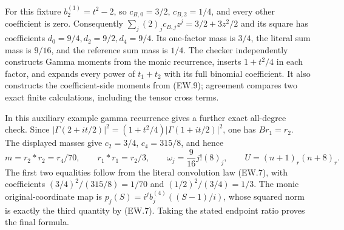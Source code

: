 \documentclass[11pt]{article}
\begin{document}
For this fixture $b_2^{(1)}=t^2-2$, so
$c_{B,0}=3/2$, $c_{B,2}=1/4$, and every other coefficient is
zero. Consequently $\sum_j(2)_jc_{B,j}z^j=3/2+3z^2/2$ and
its square has coefficients $d_0=9/4,d_2=9/2,d_4=9/4$.
Its one-factor mass is $3/4$, the literal sum mass is $9/16$,
and the reference sum mass is $1/4$. The checker independently
constructs Gamma moments from the monic recurrence, inserts
$1+t^2/4$ in each factor, and expands every power of
$t_1+t_2$ with its full binomial coefficient. It also constructs
the coefficient-side moments from (EW.9); agreement compares
two exact finite calculations, including the tensor cross terms.

In this auxiliary example gamma recurrence gives a further exact
all-degree check. Since
$|\Gamma(2+it/2)|^2=(1+t^2/4)|\Gamma(1+it/2)|^2$, one has
$Br_1=r_2$. The displayed masses give
$c_2=3/4$, $c_4=315/8$, and hence
\[
 m=r_2*r_2=r_4/70,\qquad
 r_1*r_1=r_2/3,\qquad
 \omega_j=\frac9{16}j!(8)_j,\qquad
 U=(n+1)_r(n+8)_r.                                         \tag{EW.50}
\]
The first two equalities follow from the literal convolution law
(EW.7), with coefficients $(3/4)^2/(315/8)=1/70$ and
$(1/2)^2/(3/4)=1/3$. The monic original-coordinate map is
$p_j(S)=i^jb_j^{(4)}((S-1)/i)$, whose squared norm is exactly
the third quantity by (EW.7). Taking the stated endpoint ratio
proves the final formula.
\end{document}
